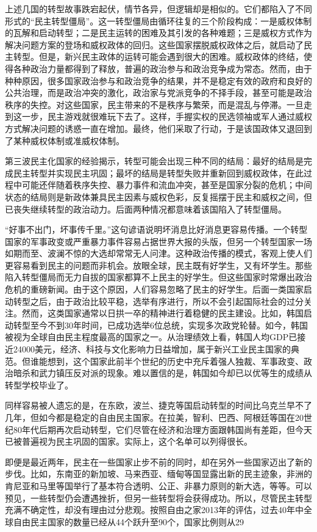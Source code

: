 上述几国的转型故事跌宕起伏，情节各异，但逻辑却是相似的。它们都陷入了不同形式的“民主转型僵局”。这一转型僵局由循环往复的三个阶段构成：一是威权体制的瓦解和启动转型；二是民主运转的困难及其引发的各种难题；三是威权方式作为解决问题方案的登场和威权政体的回归。这些国家摆脱威权政体之后，就启动了民主转型。但是，新兴民主政体的运转可能会遇到很大的困难。威权政体的终结，使得各种政治力量都得到了释放，普遍的政治参与和政治竞争成为常态。然而，由于种种原因，很多国家政治参与和政治竞争的结果，并不是稳定有效的政府和良好的公共治理，而是政治冲突的激化，政治家与党派竞争的不择手段，甚至可能是政治秩序的失控。对这些国家，民主带来的不是秩序与繁荣，而是混乱与停滞。一旦走到这一步，民主游戏就很难玩下去了。这样，手握实权的民选领袖或军人通过威权方式解决问题的诱惑一直在增加。最终，他们采取了行动，于是该国政体又退回到了某种威权体制或准威权体制。

第三波民主化国家的经验揭示，转型可能会出现三种不同的结局：最好的结局是完成民主转型并实现民主巩固；最坏的结局是转型失败并重新回到威权政体，在此过程中可能还伴随着秩序失控、暴力事件和流血冲突，甚至是国家分裂的危机；中间状态的结局则是新政体兼具民主因素与威权色彩，反复摇摆于民主和威权之间，但已丧失继续转型的政治动力。后面两种情况都意味着该国陷入了转型僵局。

“好事不出门，坏事传千里。”这句谚语说明坏消息比好消息更容易传播。一个转型国家的军事政变或严重暴力事件容易占据世界大报的头版，但另一个转型国家一场如期而至、波澜不惊的大选却常常无人问津。这种政治传播的模式，客观上使人们更容易看到民主的问题而非机会。放眼全球，民主既有好学生，又有坏学生。那些陷入转型僵局而无力自拔的国家都算不上民主的好学生。但这些国家时常爆出政治危机的重磅新闻。由于这个原因，人们容易忽略了民主的好学生。后面一类国家启动转型之后，由于政治比较平稳，选举有序进行，所以不会引起国际社会的过分关注。然而，这类国家通常以日拱一卒的精神进行着稳健的民主建设。比如，韩国启动转型至今不到30年时间，已成功选举6位总统，实现多次政党轮替。如今，韩国被视为全球自由民主程度最高的国家之一。从治理绩效上看，韩国人均GDP已接近24000美元，经济、科技与文化影响力日益增加，属于新兴工业民主国家的典范。但谁能想到，这个国家此前半个世纪的历史中充斥着强人独裁、军事政变、政治暗杀和武力镇压反对派的现象。难以置信的是，韩国如今却已以优等生的成绩从转型学校毕业了。

同样容易被人遗忘的是，在东欧，波兰、捷克等国启动转型的时间比乌克兰早不了几年，但如今都是稳定的自由民主国家。在拉美，智利、巴西、阿根廷等国在20世纪80年代后期再次启动转型，它们尽管在经济和治理方面跟韩国尚有差距，但今天已被普遍视为民主巩固的国家。实际上，这个名单可以列得很长。

即便是最近两年，民主在一些国家止步不前的同时，却在另外一些国家迈出了新的步伐。比如，东南亚的新加坡、马来西亚、缅甸等国显露出新的民主迹象，非洲的肯尼亚和马里等国举行了基本符合透明、公正、非暴力原则的新大选，等等。可以预见，一些转型仍会遭遇挫折，但另一些转型将会获得成功。所以，尽管民主转型充满不确定性，却没有理由过分悲观。按照自由之家2013年的评估，过去40年中全球自由民主国家的数量已经从44个跃升至90个，国家比例则从29%

